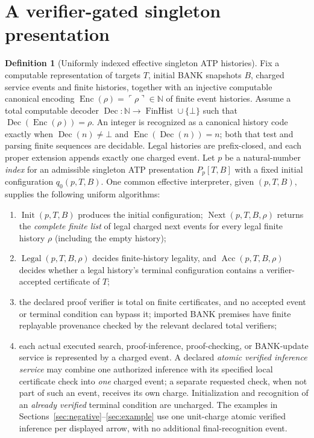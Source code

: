 \documentclass[11pt]{article}
\theoremstyle{definition}
\newtheorem{definition}[theorem]{Definition}
\newcommand{\bbN}{\mathbb{N}}
\begin{document}
\section{A verifier-gated singleton presentation}
\begin{definition}[Uniformly indexed effective singleton ATP histories]\label{def:system}
Fix a computable representation of targets $T$, initial BANK snapshots $B$, charged service events and finite histories, together with an injective computable canonical encoding $\operatorname{Enc}(\rho)=\ulcorner\rho\urcorner\in\bbN$ of finite event histories. Assume a total computable decoder $\operatorname{Dec}:\bbN\to\operatorname{FinHist}\cup\{\bot\}$ such that $\operatorname{Dec}(\operatorname{Enc}(\rho))=\rho$. An integer is recognized as a canonical history code exactly when $\operatorname{Dec}(n)\neq\bot$ and $\operatorname{Enc}(\operatorname{Dec}(n))=n$; both that test and parsing finite sequences are decidable. Legal histories are prefix-closed, and each proper extension appends exactly one charged event. Let $p$ be a natural-number \emph{index} for an admissible singleton ATP presentation $P_p[T,B]$ with a fixed initial configuration $q_0(p,T,B)$. One common effective interpreter, given $(p,T,B)$, supplies the following uniform algorithms:
\begin{enumerate}[label=(\roman*)]
\item $\operatorname{Init}(p,T,B)$ produces the initial configuration; $\operatorname{Next}(p,T,B,\rho)$ returns the \emph{complete finite list} of legal charged next events for every legal finite history $\rho$ (including the empty history);
\item $\operatorname{Legal}(p,T,B,\rho)$ decides finite-history legality, and $\operatorname{Acc}(p,T,B,\rho)$ decides whether a legal history's terminal configuration contains a verifier-accepted certificate of $T$;
\item the declared proof verifier is total on finite certificates, and no accepted event or terminal condition can bypass it; imported BANK premises have finite replayable provenance checked by the relevant declared total verifiers;
\item each actual executed search, proof-inference, proof-checking, or BANK-update service is represented by a charged event. A declared \emph{atomic verified inference service} may combine one authorized inference with its specified local certificate check into \emph{one} charged event; a separate requested check, when not part of such an event, receives its own charge. Initialization and recognition of an \emph{already verified} terminal condition are uncharged. The examples in Sections~\ref{sec:negative}--\ref{sec:example} use one unit-charge atomic verified inference per displayed arrow, with no additional final-recognition event.

\end{enumerate}
\end{definition}
\end{document}
